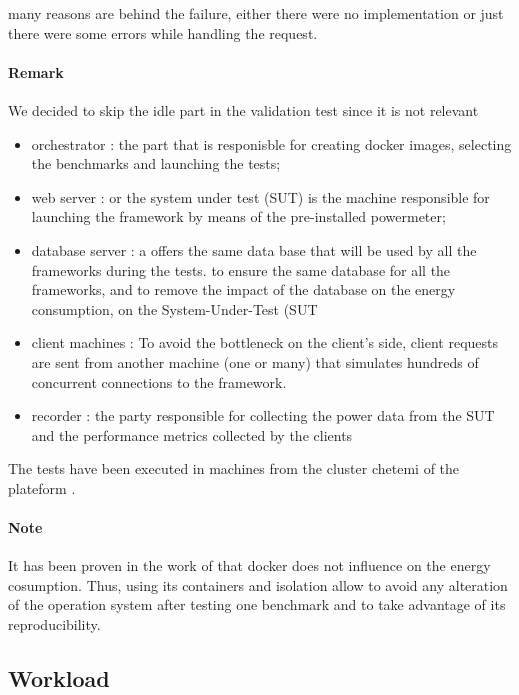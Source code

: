 many reasons are behind the failure, either there were no implementation or just there were some errors while handling the request.
\paragraph{Remark}
We decided to skip the idle part in the validation test since it is not relevant



\begin{itemize}
    \item orchestrator : the part that is responisble for creating docker images, selecting the benchmarks and launching the tests;
    \item web server : or the system under test (SUT) is the machine  responsible for launching the framework  by means of the pre-installed powermeter;
    \item database server : a offers the same data base that will be used by all the frameworks during the tests. to ensure the same database for all the frameworks, and to remove the impact of the database on the energy consumption, on the System-Under-Test (SUT
    \item client machines : To avoid the bottleneck on the client's side, client requests are sent from another machine (one or many) that simulates hundreds of concurrent connections to the framework.
    \item recorder : the party responsible for collecting the power data from the SUT and the performance metrics collected by the clients 
\end{itemize}

The tests have been executed in machines from the cluster chetemi of the  plateform .

\paragraph{Note}
It has been proven in the work of \citeauthor{eddie_antonio_santos_how} that docker does not influence on the energy cosumption\cite{eddie_antonio_santos_how}. Thus, using its containers and isolation allow to avoid any alteration of the operation system after testing one benchmark and to take advantage of its reproducibility.

\subsection{Workload}

